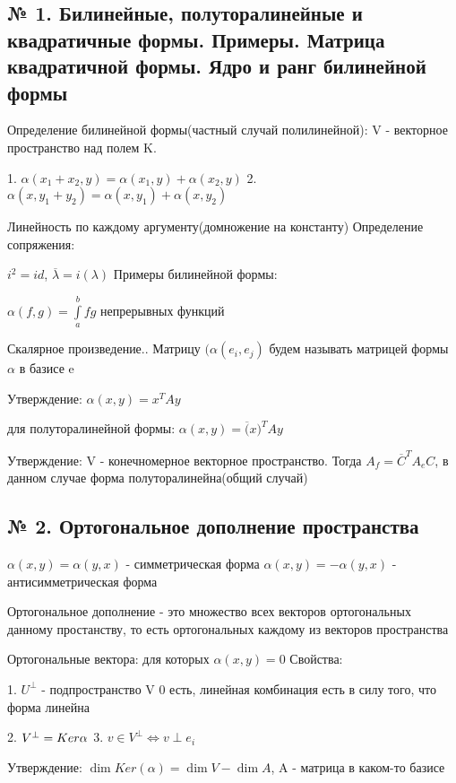 \documentclass{article}
\begin{document}
\tiny

\subsection{\tiny № 1. Билинейные, полуторалинейные и квадратичные формы. Примеры. Матрица квадратичной формы. Ядро и ранг билинейной формы}

Определение билинейной формы(частный случай полилинейной):
V - векторное пространство над полем K.

1. $\alpha(x_1 + x_2 , y) = \alpha(x_1, y) + \alpha(x_2, y)$
2. $\alpha(x, y_1 + y_2) = \alpha(x, y_1) + \alpha(x, y_2)$

Линейность по каждому аргументу(домножение на константу)
Определение сопряжения:

$i^2 = id$, $\overline{\lambda} = i(\lambda)$
Примеры билинейной формы: 

$\alpha(f, g) = \int\limits_a^b{fg}$ непрерывных функций

Скалярное произведение..
Матрицу $(\alpha(e_i, e_j)$ будем называть матрицей формы $\alpha$ в базисе e

Утверждение: $\alpha(x, y) = x^TAy$

для полуторалинейной формы: $\alpha(x, y) = \overline(x)^TAy$

Утверждение: V - конечномерное векторное пространство. Тогда $A_f = \overline{C}^{T} A_e C$, в данном случае форма полуторалинейна(общий случай)

\subsection{\tiny № 2. Ортогональное дополнение пространства}

$\alpha(x, y) = \alpha(y, x)$ - симметрическая форма
$\alpha(x, y) = - \alpha(y, x)$ - антисимметрическая форма

Ортогональное дополнение - это множество всех векторов ортогональных данному простанству, то есть ортогональных каждому из векторов пространства


Ортогональные вектора: для которых $\alpha(x, y) = 0$
Свойства:

1. $U^\perp$ - подпространство V
0 есть, линейная комбинация есть в силу того, что форма линейна

2. $V^\perp = Ker \space \alpha$
3. $v \in V^\perp \Leftrightarrow v \perp e_i$

Утверждение: $\dim{Ker(\alpha)} = \dim V - \dim{A}$, A - матрица в каком-то базисе
\end{document}
